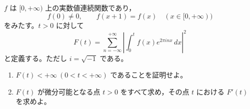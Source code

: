 \documentclass[12pt]{jlreq}
\begin{document}
\(f\) は \([0,+\infty)\) 上の実数値連続関数であり，
\[
  f(0)\ne0,\qquad f(x+1)=f(x)\quad (x\in[0,+\infty))
\]
をみたす。\(t>0\) に対して
\[
  F(t)=\sum_{n=-\infty}^{+\infty}
  \left|\int_0^t f(x)e^{2\pi i n x}\,dx\right|^2
\]
と定義する。ただし \(i=\sqrt{-1}\) である。

\begin{enumerate}
  \item \(F(t)<+\infty\ (0<t<+\infty)\) であることを証明せよ。
  \item \(F(t)\) が微分可能となる点 \(t>0\) をすべて求め，その点 \(t\) における \(F'(t)\) を求めよ。
\end{enumerate}
\end{document}

